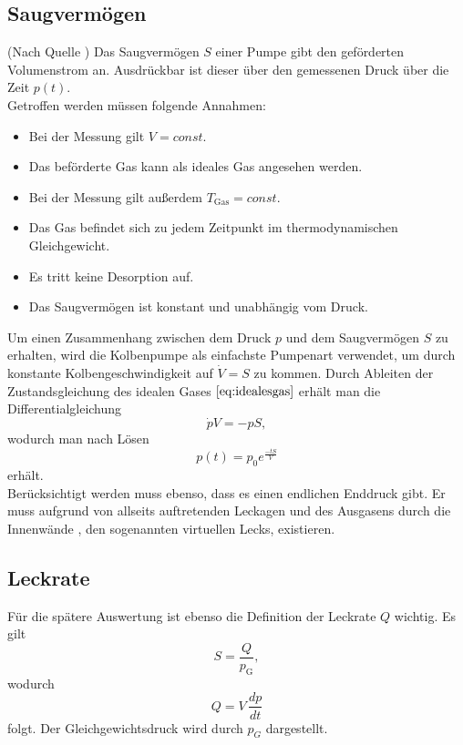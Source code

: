 \subsection{Saugvermögen}
(Nach Quelle \cite{anleitung})
Das Saugvermögen $S$ einer Pumpe gibt den geförderten Volumenstrom an.
Ausdrückbar ist dieser über den gemessenen Druck über die Zeit $p(t)$.\\
Getroffen werden müssen folgende Annahmen:
\begin{itemize}
  \item Bei der Messung gilt $V=const$.
  \item Das beförderte Gas kann als ideales Gas angesehen werden.
  \item Bei der Messung gilt außerdem $T_\text{Gas}=const$.
  \item Das Gas befindet sich zu jedem Zeitpunkt im thermodynamischen Gleichgewicht.
  \item Es tritt keine Desorption auf.
  \item Das Saugvermögen ist konstant und unabhängig vom Druck.
\end{itemize}
Um einen Zusammenhang zwischen dem Druck $p$ und dem Saugvermögen $S$ zu erhalten, wird die Kolbenpumpe als einfachste Pumpenart verwendet,
um durch konstante Kolbengeschwindigkeit auf $\dot{V}=S$ zu kommen.
Durch Ableiten der Zustandsgleichung des idealen Gases $\ref{eq:idealesgas}$ erhält man die Differentialgleichung
\begin{equation}
  \dot{p}V=-pS,
\end{equation}
wodurch man nach Lösen
\begin{equation}
  p(t)=p_0 e^{\frac{-tS}{V}}
\end{equation}
erhält.\\
Berücksichtigt werden muss ebenso, dass es einen endlichen Enddruck gibt.
Er muss aufgrund von allseits auftretenden Leckagen und des Ausgasens durch die Innenwände , den sogenannten virtuellen Lecks, existieren.
\subsection{Leckrate}
Für die spätere Auswertung ist ebenso die Definition der Leckrate $Q$ wichtig. Es gilt
\begin{equation}
  S=\frac{Q}{p_\text{G}},
  \label{eq:leckrate1}
\end{equation}
wodurch
\begin{equation}
  Q=V \, \frac{dp}{dt}
  \label{eq:leckrate2}
\end{equation}
folgt.
Der Gleichgewichtsdruck wird durch $p_G$ dargestellt.
